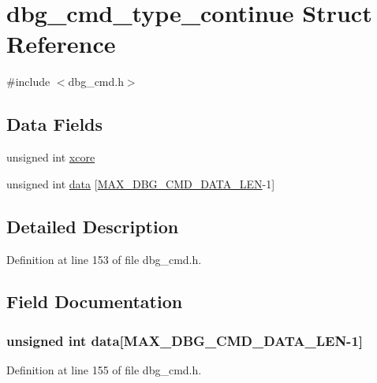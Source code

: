 \hypertarget{structdbg__cmd__type__continue}{\section{dbg\-\_\-cmd\-\_\-type\-\_\-continue Struct Reference}
\label{structdbg__cmd__type__continue}
}


{\ttfamily \#include $<$dbg\-\_\-cmd.\-h$>$}

\subsection*{Data Fields}
\begin{DoxyCompactItemize}
\item 
unsigned int \hyperlink{structdbg__cmd__type__continue_a78357326dd562d441c3c73f5676ac638}{xcore}
\item 
unsigned int \hyperlink{structdbg__cmd__type__continue_abceed6826af53b88f4cc936fac1716f0}{data} \mbox{[}\hyperlink{dbg__cmd_8h_a4552ec15033c8a68870cdf80eda5470c}{M\-A\-X\-\_\-\-D\-B\-G\-\_\-\-C\-M\-D\-\_\-\-D\-A\-T\-A\-\_\-\-L\-E\-N}-\/1\mbox{]}
\end{DoxyCompactItemize}


\subsection{Detailed Description}


Definition at line 153 of file dbg\-\_\-cmd.\-h.



\subsection{Field Documentation}
\hypertarget{structdbg__cmd__type__continue_abceed6826af53b88f4cc936fac1716f0}{
\subsubsection[{data}]{\setlength{\rightskip}{0pt plus 5cm}unsigned int data\mbox{[}{\bf M\-A\-X\-\_\-\-D\-B\-G\-\_\-\-C\-M\-D\-\_\-\-D\-A\-T\-A\-\_\-\-L\-E\-N}-\/1\mbox{]}}}\label{structdbg__cmd__type__continue_abceed6826af53b88f4cc936fac1716f0}


Definition at line 155 of file dbg\-\_\-cmd.\-h.

